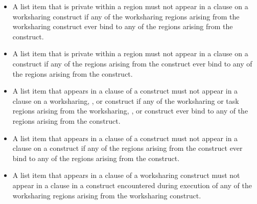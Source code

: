 \begin{itemize}
\item A list item that is private within a  region must
not appear in a  clause on a worksharing construct
if any of the worksharing regions arising
from the worksharing construct ever bind to any of the
 regions arising from the  construct.

\item A list item that is private within a  region must not appear in a
 clause on a  construct if any of the 
regions arising from the  construct ever bind to any of the 
regions arising from the  construct.

\item A list item that appears in a  clause of a 
construct must not appear in a  clause on a worksharing, ,
or  construct if any of the worksharing or task regions arising from
the worksharing, , or  construct ever bind to any of the
 regions arising from the  construct.

\item A list item that appears in a  clause of a  construct must not
appear in a  clause on a  construct if any of the
 regions arising from the  construct ever bind to any of
the  regions arising from the  construct.

\item A list item that appears in a  clause of a worksharing construct must not
appear in a  clause in a  construct encountered during execution
of any of the worksharing regions arising from the worksharing construct.

%
\end{itemize}
